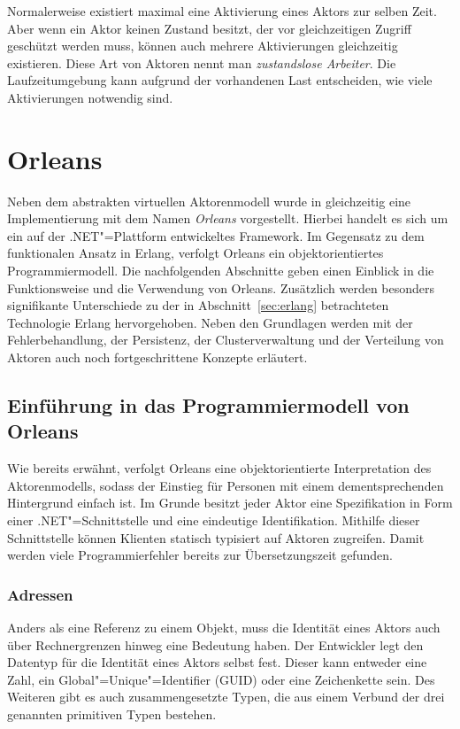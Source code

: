 Normalerweise existiert maximal eine Aktivierung eines Aktors zur selben Zeit. Aber wenn ein Aktor keinen Zustand besitzt, der vor gleichzeitigen Zugriff geschützt werden muss, können auch mehrere Aktivierungen gleichzeitig existieren. Diese Art von Aktoren nennt man \textsl{zustandslose Arbeiter}. Die Laufzeitumgebung kann aufgrund der vorhandenen Last entscheiden, wie viele Aktivierungen notwendig sind.

\section{Orleans}

Neben dem abstrakten virtuellen Aktorenmodell wurde in \cite{virtualActors} gleichzeitig eine Implementierung mit dem Namen \textit{Orleans} vorgestellt. Hierbei handelt es sich um ein auf der .NET"=Plattform entwickeltes Framework. Im Gegensatz zu dem funktionalen Ansatz in Erlang, verfolgt Orleans ein objektorientiertes Programmiermodell. Die nachfolgenden Abschnitte geben einen Einblick in die Funktionsweise und die Verwendung von Orleans. Zusätzlich werden besonders signifikante Unterschiede zu der in Abschnitt~\ref{sec:erlang} betrachteten Technologie Erlang hervorgehoben. Neben den Grundlagen werden mit der Fehlerbehandlung, der Persistenz, der Clusterverwaltung und der Verteilung von Aktoren auch noch fortgeschrittene Konzepte erläutert.

\subsection{Einführung in das Programmiermodell von Orleans}

Wie bereits erwähnt, verfolgt Orleans eine objektorientierte Interpretation des Aktorenmodells, sodass der Einstieg für Personen mit einem dementsprechenden Hintergrund einfach ist. 
Im Grunde besitzt jeder Aktor eine Spezifikation in Form einer .NET"=Schnittstelle und eine eindeutige Identifikation. Mithilfe dieser Schnittstelle können Klienten statisch typisiert auf Aktoren zugreifen. Damit werden viele Programmierfehler bereits zur Übersetzungszeit gefunden.

\subsubsection{Adressen}

Anders als eine Referenz zu einem Objekt, muss die Identität eines Aktors auch über Rechnergrenzen hinweg eine Bedeutung haben. Der Entwickler legt den Datentyp für die Identität eines Aktors selbst fest. Dieser kann entweder eine Zahl, ein Global"=Unique"=Identifier (GUID) oder eine Zeichenkette sein. Des Weiteren gibt es auch zusammengesetzte Typen, die aus einem Verbund der drei genannten primitiven Typen bestehen.

